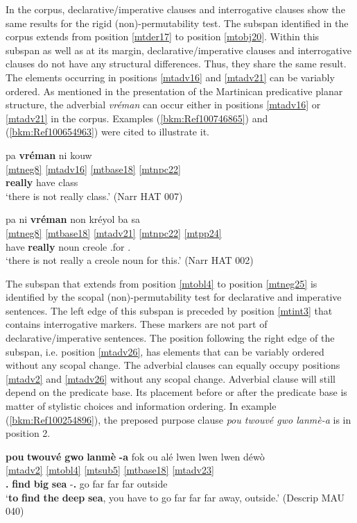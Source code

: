 \documentclass[output=paper]{langscibook}
\begin{document}
In the corpus, declarative/imperative clauses and interrogative clauses show the same results for the rigid (non)-permutability test. The subspan identified in the corpus extends from position \ref{mtder17} to position \ref{mtobj20}. Within this subspan as well as at its margin, declarative/imperative clauses and interrogative clauses do not have any structural differences. Thus, they share the same result. The elements occurring in positions \ref{mtadv16} and \ref{mtadv21} can be variably ordered. As mentioned in the presentation of the Martinican predicative planar structure, the adverbial \textit{vréman} can occur either in positions \ref{mtadv16} or \ref{mtadv21} in the corpus. Examples (\ref{bkm:Ref100746865}) and (\ref{bkm:Ref100654963}) were cited to illustrate it.


\ea\label{bkm:Ref100746865}
\glll pa \textbf{vréman} ni kouw\\
\ref{mtneg8} \ref{mtadv16} \ref{mtbase18} \ref{mtnpc22} \\
\Neg{} \textbf{really} have class\\
\glt `there is not really class.' (Narr HAT 007)
\z


\ea\label{bkm:Ref100654963}
\glll pa ni \textbf{vréman} non kréyol ba sa\\
\ref{mtneg8} \ref{mtbase18} \ref{mtadv21} \ref{mtnpc22} {} \ref{mtpp24} {} \\ 
\Neg{} have \textbf{really} noun creole \Prep{}.for \Dem{}.\Pr{}\\
\glt `there is not really a creole noun for this.' (Narr HAT 002)
\z

The subspan that extends from position \ref{mtobl4} to position \ref{mtneg25} is identified by the scopal (non)-permutability test for declarative and imperative sentences. The left edge of this subspan is preceded by position \ref{mtint3} that contains interrogative markers. These markers are not part of declarative/imperative sentences. The position following the right edge of the subspan, i.e. position \ref{mtadv26}, has elements that can be variably ordered without any scopal change. The adverbial clauses can equally occupy positions \ref{mtadv2} and \ref{mtadv26} without any scopal change. Adverbial clause will still depend on the predicate base. Its placement before or after the predicate base is matter of stylistic choices and information ordering. In example (\ref{bkm:Ref100254896}), the preposed purpose clause \textit{pou twouvé gwo lanmè-a} is in position 2.


\ea\label{bkm:Ref100254896}
\glll\textbf{pou} \textbf{twouvé} \textbf{gwo} \textbf{lanmè} \textbf{-a} fok ou alé lwen lwen lwen déwò\\
\ref{mtadv2} {} {} {} {} \ref{mtobl4} \ref{mtsub5} \ref{mtbase18} \ref{mtadv23} {} {} {} \\ 
\textbf{\Sub.\Purp{}} \textbf{find} \textbf{big} \textbf{sea} -\textbf{\Def.\Art{}} \Obl{} \Second\Sg{} go far far far outside\\
\glt `\textbf{to} \textbf{find} \textbf{the} \textbf{deep} \textbf{sea}, you have to go far far far away, outside.' (Descrip MAU 040)
\z
\end{document}
